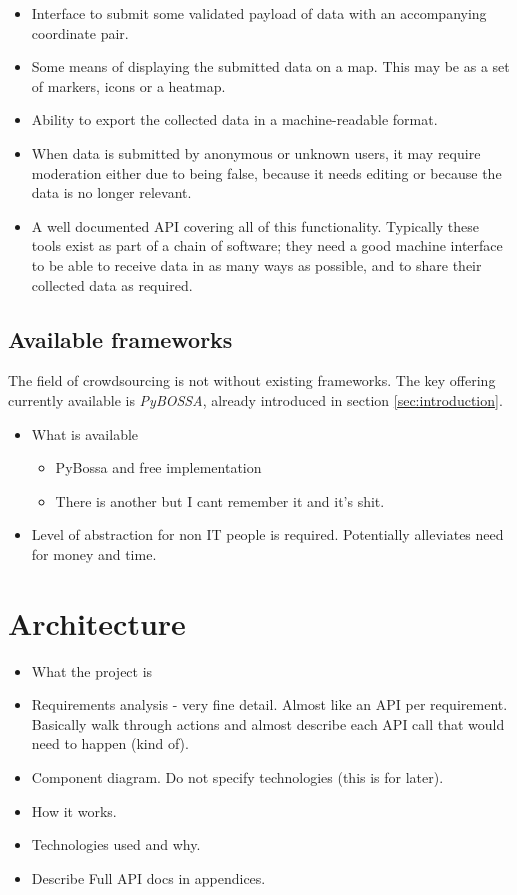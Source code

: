 \documentclass{article}
\let\oldsection\section
\renewcommand\section{\clearpage\oldsection}
\begin{document}
		\begin{itemize}
			\item Interface to submit some validated payload of data with an accompanying coordinate pair.
			\item Some means of displaying the submitted data on a map. This may be as a set of markers, icons or a heatmap.
			\item Ability to export the collected data in a machine-readable format.
			\item When data is submitted by anonymous or unknown users, it may require moderation either due to being false, because it needs editing or because the data is no longer relevant.
			\item A well documented API covering all of this functionality. Typically these tools exist as part of a chain of software; they need a good machine interface to be able to receive data in as many ways as possible, and to share their collected data as required.
		\end{itemize}

		\subsection{Available frameworks}

		The field of crowdsourcing is not without existing frameworks. The key offering currently available is \textit{PyBOSSA}, already introduced in section \ref{sec:introduction}.

		\begin{itemize}
			\item What is available
			\begin{itemize}
				\item PyBossa and free implementation
				\item There is another but I cant remember it and it's shit.
			\end{itemize}
			\item Level of abstraction for non IT people is required. Potentially alleviates need for money and time.
		\end{itemize}

	\section{Architecture}
	\label{sec:architecture}
		\begin{itemize}
			\item What the project is
			\item Requirements analysis - very fine detail. Almost like an API per requirement. Basically walk through actions and almost describe each API call that would need to happen (kind of).
			\item Component diagram. Do not specify technologies (this is for later).
			\item How it works.
			\item Technologies used and why.
			\item Describe Full API docs in appendices.
		\end{itemize}
\end{document}
